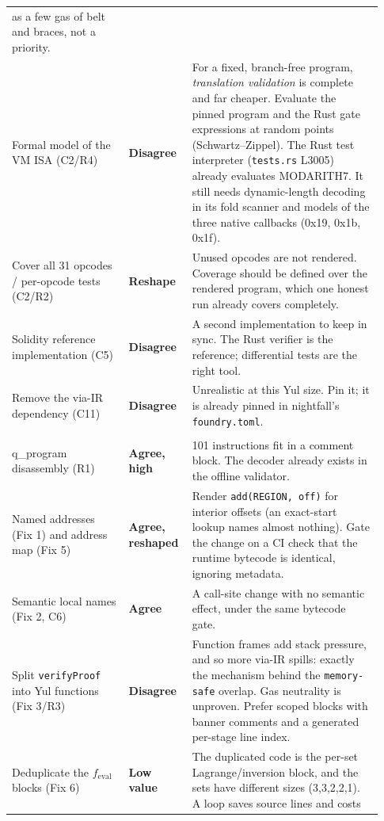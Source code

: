 \begin{center}
\begin{longtable}{@{}p{0.30\linewidth}p{0.14\linewidth}p{0.49\linewidth}@{}}
  as a few gas of belt and braces, not a priority. \\
Formal model of the VM ISA (C2/R4) & \textbf{Disagree} &
  For a fixed, branch-free program, \emph{translation validation} is
  complete and far cheaper. Evaluate the pinned program and the Rust
  gate expressions at random points (Schwartz--Zippel). The Rust test
  interpreter (\texttt{tests.rs} L3005) already evaluates MODARITH7. It
  still needs dynamic-length decoding in its fold scanner and models of the
  three native callbacks (0x19, 0x1b, 0x1f). \\
Cover all 31 opcodes / per-opcode tests (C2/R2) & \textbf{Reshape} &
  Unused opcodes are not rendered. Coverage should be defined over the
  rendered program, which one honest run already covers completely. \\
Solidity reference implementation (C5) & \textbf{Disagree} &
  A second implementation to keep in sync. The Rust verifier is the
  reference; differential tests are the right tool. \\
Remove the via-IR dependency (C11) & \textbf{Disagree} &
  Unrealistic at this Yul size. Pin it; it is already pinned in
  nightfall's \texttt{foundry.toml}. \\
\addlinespace
\multicolumn{3}{@{}l}{\emph{Code quality and readability}} \\
q\_program disassembly (R1) & \textbf{Agree, high} &
  101 instructions fit in a comment block. The decoder already exists in
  the offline validator. \\
Named addresses (Fix 1) and address map (Fix 5) & \textbf{Agree, reshaped} &
  Render \texttt{add(REGION, off)} for interior offsets (an exact-start
  lookup names almost nothing). Gate the change on a CI check that the
  runtime bytecode is identical, ignoring metadata. \\
Semantic local names (Fix 2, C6) & \textbf{Agree} &
  A call-site change with no semantic effect, under the same bytecode
  gate. \\
Split \texttt{verifyProof} into Yul functions (Fix 3/R3) & \textbf{Disagree} &
  Function frames add stack pressure, and so more via-IR spills: exactly the
  mechanism behind the \texttt{memory-safe} overlap. Gas neutrality is
  unproven. Prefer scoped blocks with banner comments and a generated
  per-stage line index. \\
Deduplicate the $f_\text{eval}$ blocks (Fix 6) & \textbf{Low value} &
  The duplicated code is the per-set Lagrange/inversion block, and the sets
  have different sizes (3,3,2,2,1). A loop saves source lines and costs

\end{longtable}
\end{center}
